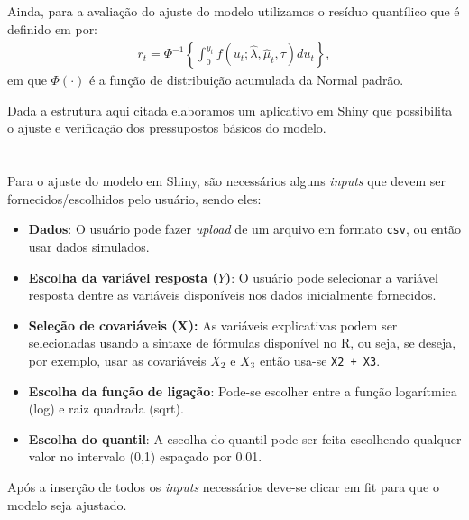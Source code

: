 \documentclass{sciposter}
\begin{document}
\begin{multicols*}{2}
{Ainda, para a avaliação do ajuste do modelo utilizamos o resíduo quantílico que é definido em \cite{dun1996} por:
\begin{align*}
 r_t= \Phi^{-1}\left\lbrace \int_{0}^{y_t}f(u_t; \widehat{\lambda}, \widehat{\mu}_t, \tau )du_t\right\rbrace,
\end{align*}
em que $\Phi(\cdot)$  é a função de distribuição acumulada da Normal padrão.
\vspace{0.2cm}

Dada a estrutura aqui citada elaboramos um aplicativo em Shiny que possibilita o ajuste e verificação dos pressupostos básicos do modelo. 
\vspace{-0.2cm}

\section*{}
\vspace{0.2cm}

Para o ajuste do modelo em Shiny, são necessários alguns \textit{inputs} que devem ser fornecidos/escolhidos pelo usuário, sendo eles:

\begin{itemize}
  \item \textbf{Dados}: O usuário pode fazer \textit{upload} de um arquivo em formato {\tt csv}, ou então usar dados simulados.
  \item \textbf{Escolha da variável resposta ($Y$)}: O usuário pode selecionar a variável resposta dentre as variáveis disponíveis nos dados inicialmente fornecidos.
  \item \textbf{Seleção de covariáveis ($\bm{X}$):} As variáveis explicativas podem ser selecionadas usando a sintaxe de fórmulas disponível no R, ou seja, se deseja, por exemplo, usar as covariáveis $X_2$ e $X_3$ então usa-se {\tt X2 + X3}.
  \item \textbf{Escolha da função de ligação}: Pode-se escolher entre a função logarítmica (log) e raiz quadrada (sqrt).
  \item \textbf{Escolha do quantil}: A escolha do quantil pode ser feita escolhendo qualquer valor no intervalo (0,1) espaçado por 0.01.
\end{itemize}
Após a inserção de todos os \textit{inputs} necessários deve-se clicar em fit para que o modelo seja ajustado.




\vspace{0.4cm}


}
\end{multicols*}
\end{document}
